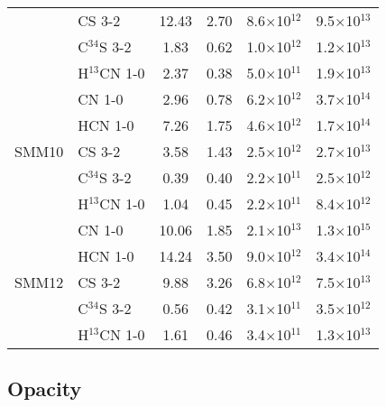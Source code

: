 \documentclass{aa}
\begin{document}
\begin{table*}
\begin{tabular}{l l c c c c}
       {} & CS 3-2 & 12.43 & 2.70 & 8.6$\times$10$^{12}$ & 9.5$\times$10$^{13}$\\ 
       {} & C$^{34}$S 3-2 & 1.83 & 0.62 & 1.0$\times$10$^{12}$ & 1.2$\times$10$^{13}$ \\
        {} & H$^{13}$CN 1-0 & 2.37 & 0.38 & 5.0$\times$10$^{11}$ & 1.9$\times$10$^{13}$ \\ 
        \hline \multirow{5}{*}{SMM10} & CN 1-0 & 2.96 & 0.78 & 6.2$\times$10$^{12}$ & 3.7$\times$10$^{14}$\\ 
        {} & HCN 1-0 & 7.26 & 1.75 & 4.6$\times$10$^{12}$ & 1.7$\times$10$^{14}$\\
         {} & CS 3-2 & 3.58 & 1.43 & 2.5$\times$10$^{12}$ & 2.7$\times$10$^{13}$ \\ 
         {} & C$^{34}$S 3-2 & 0.39 & 0.40 & 2.2$\times$10$^{11}$ & 2.5$\times$10$^{12}$ \\ 
         {} & H$^{13}$CN 1-0 & 1.04 & 0.45 & 2.2$\times$10$^{11}$ & 8.4$\times$10$^{12}$\\ 
         \hline \multirow{5}{*}{SMM12} & CN 1-0 & 10.06 & 1.85 & 2.1$\times$10$^{13}$ & 1.3$\times$10$^{15}$\\
          {} & HCN 1-0 & 14.24 & 3.50 & 9.0$\times$10$^{12}$ & 3.4$\times$10$^{14}$\\ 
          {} & CS 3-2 & 9.88 & 3.26 & 6.8$\times$10$^{12}$ & 7.5$\times$10$^{13}$\\
           {} & C$^{34}$S 3-2 & 0.56 & 0.42 & 3.1$\times$10$^{11}$ & 3.5$\times$10$^{12}$\\ 
           {} & H$^{13}$CN 1-0 & 1.61 & 0.46 & 3.4$\times$10$^{11}$ & 1.3$\times$10$^{13}$\\ 
           \hline 
           \end{tabular}
           \end{table*}


\subsection{Opacity}
\end{document}
